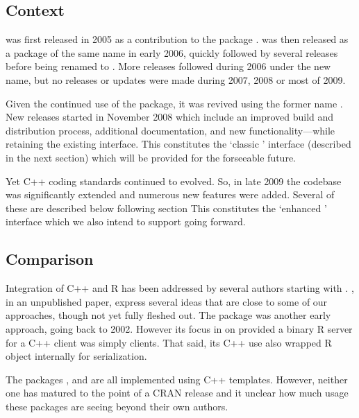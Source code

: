 \subsection{Context}

 was first released in 2005 as a contribution
to the  package \citep{eddelbuettelkhan09:rquantlib}.
 was then released as a package of the same name in early 2006,
quickly followed by several releases before being renamed to
. More releases followed during 2006 under the new name,
but no releases or updates were made during 2007, 2008 or most of 2009.

Given the continued use of the package, it was revived using the former name
. New releases started in November 2008 which include an improved
build and distribution process, additional documentation, and new
functionality---while retaining the existing interface.  This constitutes the
`classic ' interface (described in the next section)
which will be provided for the forseeable future.

Yet C++ coding standards continued to evolved. So, in late 2009 the codebase
was significantly extended and numerous new features were added.  Several of
these are described below following section %
This constitutes the `enhanced ' interface which we also intend to support going forward.

\subsection{Comparison}

Integration of C++ and R has been addressed by several authors starting with
\cite{batesdebroy01:cppclasses}. \cite{javagailemanly07:r_cpp}, in an
unpublished paper, express several ideas that are close to some of our
approaches, though not yet fully fleshed out.
%
The  package \citep{cran:Rserve} was another early approach,
going back to 2002. However its focus in on provided a binary R server for a
C++ client was simply clients. That said, its C++ use also wrapped R object
internally for serialization.

The packages  \citep{liang08:rcppbind}, 
\citep{armstrong09:RAbstraction} and 
\citep{armstrong09:RObjects} are all implemented using C++ templates.
However, neither one has matured to the point of a CRAN release and it
unclear how much usage these packages are seeing beyond their own authors.

